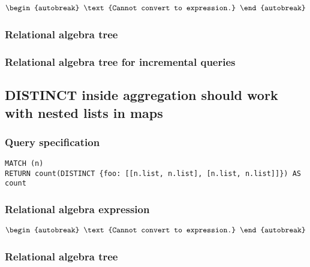 \begin{align*}
\begin{autobreak}
\text{Cannot convert to expression.}
\end{autobreak}
\end{align*}

\subsubsection*{Relational algebra tree}


\subsubsection*{Relational algebra tree for incremental queries}


\subsection{DISTINCT inside aggregation should work with nested lists in maps}

\subsubsection*{Query specification}

\begin{lstlisting}
MATCH (n)
RETURN count(DISTINCT {foo: [[n.list, n.list], [n.list, n.list]]}) AS count
\end{lstlisting}

\subsubsection*{Relational algebra expression}

\begin{align*}
\begin{autobreak}
\text{Cannot convert to expression.}
\end{autobreak}
\end{align*}

\subsubsection*{Relational algebra tree}


